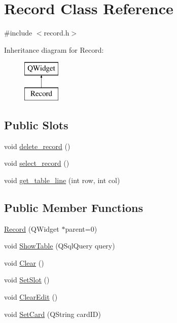 \hypertarget{class_record}{}\section{Record Class Reference}
\label{class_record}


{\ttfamily \#include $<$record.\+h$>$}

Inheritance diagram for Record\+:\begin{figure}[H]
\begin{center}
\leavevmode
\includegraphics[height=2.000000cm]{class_record}
\end{center}
\end{figure}
\subsection*{Public Slots}
\begin{DoxyCompactItemize}
\item 
void \mbox{\hyperlink{class_record_a4c0e51ba399bdec6c9630b193914e7fb}{delete\+\_\+record}} ()
\item 
void \mbox{\hyperlink{class_record_a5fdd1f2b39a2de50ec73b57bb24bb8dc}{select\+\_\+record}} ()
\item 
void \mbox{\hyperlink{class_record_a89ae432465b31de8a27e2fe8e929b62a}{get\+\_\+table\+\_\+line}} (int row, int col)
\end{DoxyCompactItemize}
\subsection*{Public Member Functions}
\begin{DoxyCompactItemize}
\item 
\mbox{\hyperlink{class_record_af85c9f8ff0abca5ee43b4a024557f38a}{Record}} (Q\+Widget $\ast$parent=0)
\item 
void \mbox{\hyperlink{class_record_aa1e340f0b1a776819d30d23c1424cbd2}{Show\+Table}} (Q\+Sql\+Query query)
\item 
void \mbox{\hyperlink{class_record_af70466cb248483ed2a32fb5a48a83cac}{Clear}} ()
\item 
void \mbox{\hyperlink{class_record_acc7b3423b809a15465c21f51353392d5}{Set\+Slot}} ()
\item 
void \mbox{\hyperlink{class_record_ad33ee61f2d53795e3090426aa3ba6af0}{Clear\+Edit}} ()
\item 
void \mbox{\hyperlink{class_record_ac08eeade2dbe9fd49ba7d508865f2ab1}{Set\+Card}} (Q\+String card\+ID)
\end{DoxyCompactItemize}


